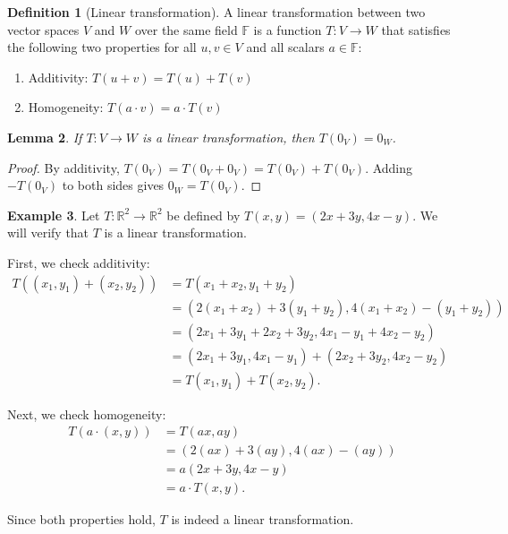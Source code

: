 \documentclass[11pt]{article}
\theoremstyle{definition}
\newtheorem{definition}{Definition}[section]
\newtheorem{example}[definition]{Example}
\theoremstyle{plain}
\newtheorem{lemma}[definition]{Lemma}
\theoremstyle{remark}
\begin{document}
\begin{definition}[Linear transformation]
    A linear transformation between two vector spaces $V$ and $W$ over the same field $\mathbb{F}$ is a function $T: V \to W$ that satisfies the following two properties for all $u, v \in V$ and all scalars $a \in \mathbb{F}$:
    \begin{enumerate}
        \item Additivity: $T(u + v) = T(u) + T(v)$
        \item Homogeneity: $T(a \cdot v) = a \cdot T(v)$
    \end{enumerate}
\end{definition}

\begin{lemma}\label{lem:zero}
    If $T: V \to W$ is a linear transformation, then $T(0_V) = 0_W$.
\end{lemma}

\begin{proof}
    By additivity, $T(0_V) = T(0_V + 0_V) = T(0_V) + T(0_V)$. Adding $-T(0_V)$ to both sides gives $0_W = T(0_V)$.
\end{proof}

\begin{example}
    Let $T: \mathbb{R}^2 \to \mathbb{R}^2$ be defined by $T(x, y) = (2x + 3y, 4x - y)$. We will verify that $T$ is a linear transformation.

    First, we check additivity:
    \begin{align*}
        T((x_1, y_1) + (x_2, y_2)) &= T(x_1 + x_2, y_1 + y_2) \\
        &= (2(x_1 + x_2) + 3(y_1 + y_2), 4(x_1 + x_2) - (y_1 + y_2)) \\
        &= (2x_1 + 3y_1 + 2x_2 + 3y_2, 4x_1 - y_1 + 4x_2 - y_2) \\
        &= (2x_1 + 3y_1, 4x_1 - y_1) + (2x_2 + 3y_2, 4x_2 - y_2) \\
        &= T(x_1, y_1) + T(x_2, y_2).
    \end{align*}

    Next, we check homogeneity:
    \begin{align*}
        T(a \cdot (x, y)) &= T(ax, ay) \\
        &= (2(ax) + 3(ay), 4(ax) - (ay)) \\
        &= a(2x + 3y, 4x - y) \\
        &= a \cdot T(x, y).
    \end{align*}

    Since both properties hold, $T$ is indeed a linear transformation.
\end{example}
\end{document}
